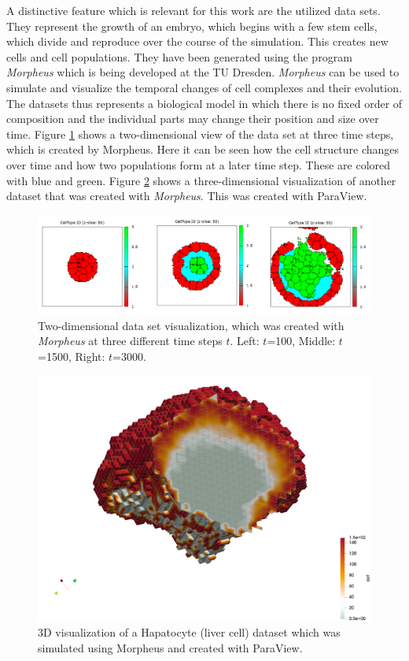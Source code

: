 A distinctive feature which is relevant for this work are the utilized data sets.
They represent the growth of an embryo, which begins with a few stem cells, which divide and reproduce over the course of the simulation. This creates new cells and cell populations.
They have been generated using the program \emph{Morpheus} which is being developed at the TU Dresden.\cite{morpheus_2022}
\emph{Morpheus} can be used to simulate and visualize the temporal changes of cell complexes and their evolution. 
The datasets thus represents a biological model in which there is no fixed order of composition and the individual parts may change their position and size over time.  
Figure \ref{fig:Dataset2D} shows a two-dimensional view of the data set at three time steps, which is created by Morpheus. Here it can be seen how the cell structure changes over time and how two populations form at a later time step. These are colored with blue and green. 
Figure \ref{fig:Dataset3D} shows a three-dimensional visualization of another dataset that was created with \emph{Morpheus}. This was created with ParaView\cite{paraview}.
\begin{figure}[h]
	\centering
	\includegraphics[width=1\linewidth]{fig/Images/Dataset2D}
	\caption[]{Two-dimensional data set visualization, which was created with \emph{Morpheus} at three different time steps $t$. Left: $t$=100, Middle: $t$=1500, Right: $t$=3000.}
	\label{fig:Dataset2D}
\end{figure}

\begin{figure}[h]
	\centering
	\includegraphics[width=0.7\linewidth]{fig/Images/Dataset3D}
	\caption[]{3D visualization of a Hapatocyte (liver cell) dataset which was simulated using Morpheus and created with ParaView.}
	\label{fig:Dataset3D}
\end{figure}
